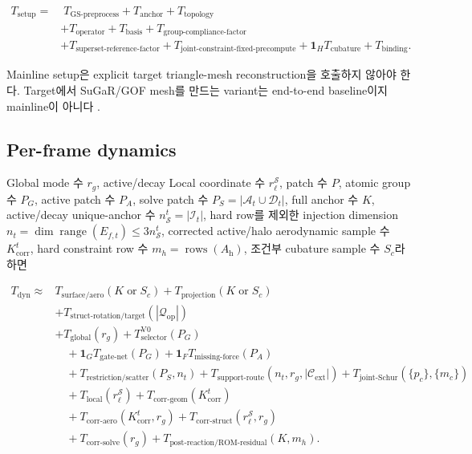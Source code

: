 \documentclass[11pt,a4paper]{article}
\begin{document}
\begin{equation}
\begin{aligned}
  T_{\mathrm{setup}}
  =&\;
  T_{\mathrm{GS\mbox{-}preprocess}}
  +T_{\mathrm{anchor}}
  +T_{\mathrm{topology}}\\
  &+T_{\mathrm{operator}}
  +T_{\mathrm{basis}}
  +T_{\mathrm{group\mbox{-}compliance\mbox{-}factor}}\\
  &+T_{\mathrm{superset\mbox{-}reference\mbox{-}factor}}
  +T_{\mathrm{joint\mbox{-}constraint\mbox{-}fixed\mbox{-}precompute}}
  +\mathbf 1_H T_{\mathrm{cubature}}
  +T_{\mathrm{binding}}.
\end{aligned}
\end{equation}

Mainline setup은 explicit target triangle-mesh reconstruction을 호출하지 않아야 한다.
Target에서 SuGaR/GOF mesh를 만드는 variant는 end-to-end baseline이지 mainline이 아니다
\cite{guedon2024sugar,yu2024gof}.

\subsection{Per-frame dynamics}

Global mode 수 \(r_g\), active/decay Local coordinate 수 \(r_\ell^{\mathcal S}\),
patch 수 \(P\), atomic group 수 \(P_G\), active patch 수 \(P_A\),
solve patch 수 \(P_S=|\mathcal A_t\cup\mathcal D_t|\), full anchor 수 \(K\),
active/decay unique-anchor 수 \(n_{\mathcal S}^t=|\mathcal I_t|\),
hard row를 제외한 injection dimension
\(n_t=\dim\operatorname{range}(E_{f,t})\le3n_{\mathcal S}^t\),
corrected active/halo aerodynamic sample 수 \(K_{\mathrm{corr}}^t\),
hard constraint row 수 \(m_h=\operatorname{rows}(A_{\mathrm h})\),
조건부 cubature sample 수 \(S_c\)라 하면

\begin{equation}
\begin{aligned}
  T_{\mathrm{dyn}}
  \approx&
  T_{\mathrm{surface/aero}}(K\;\text{or}\;S_c)
  +T_{\mathrm{projection}}(K\;\text{or}\;S_c)\\
  &+T_{\mathrm{struct\mbox{-}rotation/target}}(|\mathcal Q_{\mathrm{op}}|)\\
  &+T_{\mathrm{global}}(r_g)
  +T_{\mathrm{selector}}^{\mathrm{V0}}(P_G)\\
  &\quad
  +\mathbf 1_G T_{\mathrm{gate\mbox{-}net}}(P_G)
  +\mathbf 1_F T_{\mathrm{missing\mbox{-}force}}(P_A)\\
  &\quad
  +T_{\mathrm{restriction/scatter}}(P_S,n_t)
  +T_{\mathrm{support\mbox{-}route}}(n_t,r_g,|\mathcal C_{\mathrm{ext}}|)
  +T_{\mathrm{joint\mbox{-}Schur}}(\{p_c\},\{m_c\})\\
  &\quad
  +T_{\mathrm{local}}(r_\ell^{\mathcal S})
  +T_{\mathrm{corr\mbox{-}geom}}(K_{\mathrm{corr}}^t)\\
  &\quad
  +T_{\mathrm{corr\mbox{-}aero}}(K_{\mathrm{corr}}^t,r_g)
  +T_{\mathrm{corr\mbox{-}struct}}(r_\ell^{\mathcal S},r_g)\\
  &\quad
  +T_{\mathrm{corr\mbox{-}solve}}(r_g)
  +T_{\mathrm{post\mbox{-}reaction/ROM\mbox{-}residual}}(K,m_h).
\end{aligned}
\end{equation}
\end{document}
